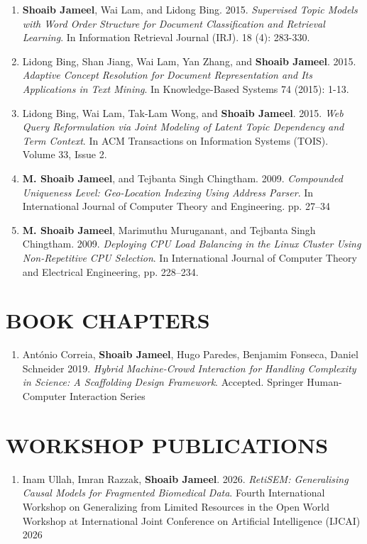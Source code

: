 \documentclass[margin]{res}
\begin{document}
\begin{resume}
\begin{enumerate}
\item \textbf{Shoaib Jameel}, Wai Lam, and Lidong Bing. 2015. \textit{Supervised Topic Models with Word Order Structure for Document Classification and Retrieval Learning}. In Information Retrieval Journal (IRJ). 18 (4): 283-330.\\
\item Lidong Bing, Shan Jiang, Wai Lam, Yan Zhang, and \textbf{Shoaib Jameel}. 2015. \textit{Adaptive Concept Resolution for Document Representation and Its Applications in Text Mining}. In Knowledge-Based Systems 74 (2015): 1-13.\\
\item Lidong Bing, Wai Lam, Tak-Lam Wong, and \textbf{Shoaib Jameel}. 2015. \textit{Web Query Reformulation via Joint Modeling of Latent Topic Dependency and Term Context}. In ACM Transactions on Information Systems (TOIS). Volume 33, Issue 2. \\

\item  \textbf{M. Shoaib Jameel}, and Tejbanta Singh Chingtham. 2009. \textit{Compounded Uniqueness Level: Geo-Location Indexing Using Address Parser}. In International Journal of Computer Theory and Engineering. pp. 27--34\\

\item  \textbf{M. Shoaib Jameel}, Marimuthu Muruganant, and Tejbanta Singh Chingtham. 2009. \textit{Deploying CPU Load Balancing in the Linux Cluster Using Non-Repetitive CPU Selection}. In International Journal of Computer Theory and Electrical Engineering, pp. 228--234.
\end{enumerate}

\section{BOOK CHAPTERS}
\begin{enumerate} \itemsep -10pt
    \item Ant\'onio Correia, \textbf{Shoaib Jameel}, Hugo Paredes, Benjamim Fonseca, Daniel Schneider 2019. \textit{Hybrid Machine-Crowd Interaction for Handling Complexity in Science: A Scaffolding Design Framework}. Accepted. Springer Human-Computer Interaction Series
\end{enumerate}

\section{WORKSHOP PUBLICATIONS}
\begin{enumerate}
\item Inam Ullah, Imran Razzak, \textbf{Shoaib Jameel}. 2026. \textit{RetiSEM: Generalising Causal Models for Fragmented Biomedical Data}. Fourth International Workshop on Generalizing from Limited Resources in the Open World Workshop at International Joint Conference on Artificial Intelligence (IJCAI) 2026


\end{enumerate}
\end{resume}
\end{document}
